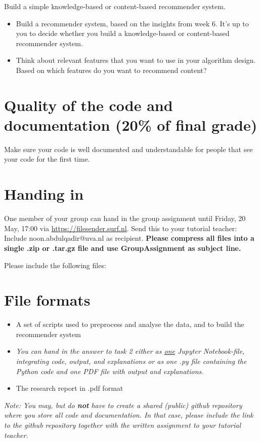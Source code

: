 Build a simple knowledge-based or content-based recommender system. 

\begin{itemize}
	\item Build a recommender system, based on the insights from week 6. It's up to you to decide whether you build a knowledge-based or content-based recommender system.
	\item Think about relevant features that you want to use in your algorithm design. Based on which features do you want to recommend content?
\end{itemize}

\section{Quality of the code and documentation (20\% of final grade)}

Make sure your code is well documented and understandable for people that see your code for the first time. 

\section{Handing in}
One member of your group can hand in the group assignment until Friday, 20 May, 17:00 via \url{https://filesender.surf.nl}. Send this to your tutorial teacher: Include noon.abdulqadir@uva.nl as recipient. \textbf{Please compress all files into a single .zip or .tar.gz file and use GroupAssignment as subject line.} 

Please include the following files:   
\section*{File formats}

\begin{itemize}
	\item  A set of scripts used to preprocess and analyse the data, and to build the recommender system
	\item \emph{
		You can hand in the answer to task 2 \emph{either} as \underline{one} Jupyter Notebook-file, integrating code, output, and explanations \emph{or} as one .py file containing the Python code and one PDF file with output and explanations.
	}
	\item The research report in .pdf format
\end{itemize}

\emph{Note: You may, but do \textbf{not} have to create a shared (public) github repository where you store all code and documentation. In that case, please include the link to the github repository together with the written assignment to your tutorial teacher.}


